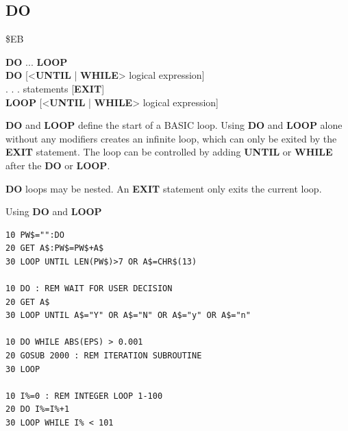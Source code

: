 \subsection{DO}
\begin{description}[leftmargin=2cm,style=nextline]
\item [Token:] \$EB
\item [Format:] {\bf DO} ... {\bf LOOP} \\
                {\bf DO} [<{\bf UNTIL} | {\bf WHILE}> logical expression] \\
                . . . statements [{\bf EXIT}] \\
                {\bf LOOP} [<{\bf UNTIL} | {\bf WHILE}> logical expression]
\item [Usage:] {\bf DO} and {\bf LOOP} define
               the start of a BASIC loop.
               Using {\bf DO} and {\bf LOOP} alone without any
               modifiers creates an infinite loop, which can only be exited
               by the {\bf EXIT} statement. The loop can be
               controlled by adding {\bf UNTIL} or {\bf WHILE}
               after the {\bf DO} or {\bf LOOP}.

\item [Remarks:] {\bf DO} loops may be nested. An {\bf EXIT} statement
               only exits the current loop.
\item [Examples:] Using {\bf DO} and {\bf LOOP}
\begin{tcolorbox}[colback=black,coltext=white]
\verbatimfont{\codefont}
\begin{verbatim}
10 PW$="":DO
20 GET A$:PW$=PW$+A$
30 LOOP UNTIL LEN(PW$)>7 OR A$=CHR$(13)

10 DO : REM WAIT FOR USER DECISION
20 GET A$
30 LOOP UNTIL A$="Y" OR A$="N" OR A$="y" OR A$="n"

10 DO WHILE ABS(EPS) > 0.001
20 GOSUB 2000 : REM ITERATION SUBROUTINE
30 LOOP

10 I%=0 : REM INTEGER LOOP 1-100
20 DO I%=I%+1
30 LOOP WHILE I% < 101
\end{verbatim}
\end{tcolorbox}
\end{description}


\newpage
